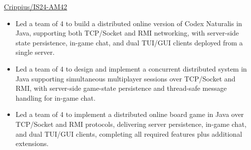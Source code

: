  {}
{
}
{\href{https://github.com/Crippius/IS24-AM42}
{Crippius/IS24-AM42}}
\begin{itemize}

    \ifde
        \item Led a team of 4 to build a distributed online version of Codex Naturalis in Java, supporting both TCP/Socket and RMI networking, with server-side state persistence, in-game chat, and dual TUI/GUI clients deployed from a single server.
    \else
        \ifhpc
            \item Led a team of 4 to design and implement a concurrent distributed system in Java supporting simultaneous multiplayer sessions over TCP/Socket and RMI, with server-side game-state persistence and thread-safe message handling for in-game chat.
        \else
            \item Led a team of 4 to implement a distributed online board game in Java over TCP/Socket and RMI protocols, delivering server persistence, in-game chat, and dual TUI/GUI clients, completing all required features plus additional extensions.
        \fi
    \fi

\end{itemize}

\medskip
